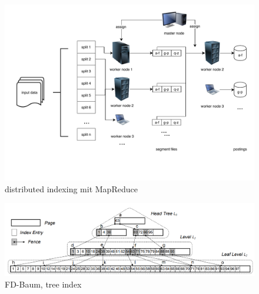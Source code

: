 \begin{figure}[hb]
  \includegraphics[width=\textwidth]{pdf/distributedIndexAll.pdf}
  \caption{distributed indexing mit MapReduce}
  \label{distribIndex}
\end{figure}

\begin{figure}[ht]
  \includegraphics[width=\textwidth]{pdf/fdtree.png}
  \caption{FD-Baum, tree index}
  \label{FD Tree}
\end{figure}

